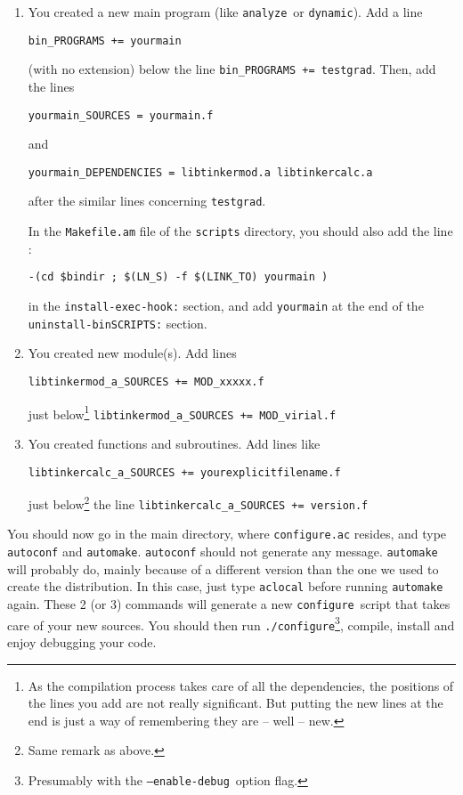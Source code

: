 \documentclass[peerreview]{IEEEtran}
\def\config{\texttt{configure}}
\def\configp{\texttt{./}\config}
\def\enadeb{\texttt{--enable-debug}}
\def\analyze{\texttt{analyze}}
\def\dynamic{\texttt{dynamic}}
\def\testgrad{\texttt{testgrad}}
\begin{document}
\begin{enumerate}
    \item You created a new main program (like \analyze\ or \dynamic). Add a line
    
    \hskip1.5cm \texttt{bin\_PROGRAMS += yourmain}
    
    (with no extension) below the line \texttt{bin\_PROGRAMS += testgrad}. Then, add the lines
    
    \hskip1.5cm \texttt{yourmain\_SOURCES = yourmain.f}
    
    and
    
    \hskip1.5cm \texttt{yourmain\_DEPENDENCIES = libtinkermod.a libtinkercalc.a }
    
    after the similar lines concerning \testgrad.
    
    In the \texttt{Makefile.am} file of the \texttt{scripts} directory, you should also add the line :
    
   \hskip1.5cm \texttt{-(cd \${bindir} ; \$(LN\_S) -f \$(LINK\_TO) yourmain )}
        
    in the \texttt{install-exec-hook:} section, and add \texttt{yourmain} at the end of the \texttt{uninstall-binSCRIPTS:} section.
    \item You created new module(s). Add lines 
    
    \hskip1.5cm \texttt{libtinkermod\_a\_SOURCES += MOD\_xxxxx.f}
    
    just below\footnote{As the compilation process takes care of all the dependencies, the positions of the lines you add are not really significant. But putting the new lines at the end is just a way of remembering they are -- well -- new.} \texttt{libtinkermod\_a\_SOURCES += MOD\_virial.f}
    \item You created functions and subroutines. Add lines like
    
    \hskip1.5cm \texttt{libtinkercalc\_a\_SOURCES += yourexplicitfilename.f}
    
    just below\footnote{Same remark as above.} the line \texttt{libtinkercalc\_a\_SOURCES += version.f}
\end{enumerate}

You should now go in the main directory, where \texttt{configure.ac} resides, and type \texttt{autoconf} and \texttt{automake}. \texttt{autoconf} should not generate any message. \texttt{automake} will probably do, mainly because of a different version than the one we used to create the distribution. In this case, just type \texttt{aclocal} before running \texttt{automake} again. These 2 (or 3) commands will generate a new \config\ script that takes care of your new sources. You should then run \configp\footnote{Presumably with the \enadeb\ option flag.}, compile, install and enjoy debugging your code.
\end{document}
